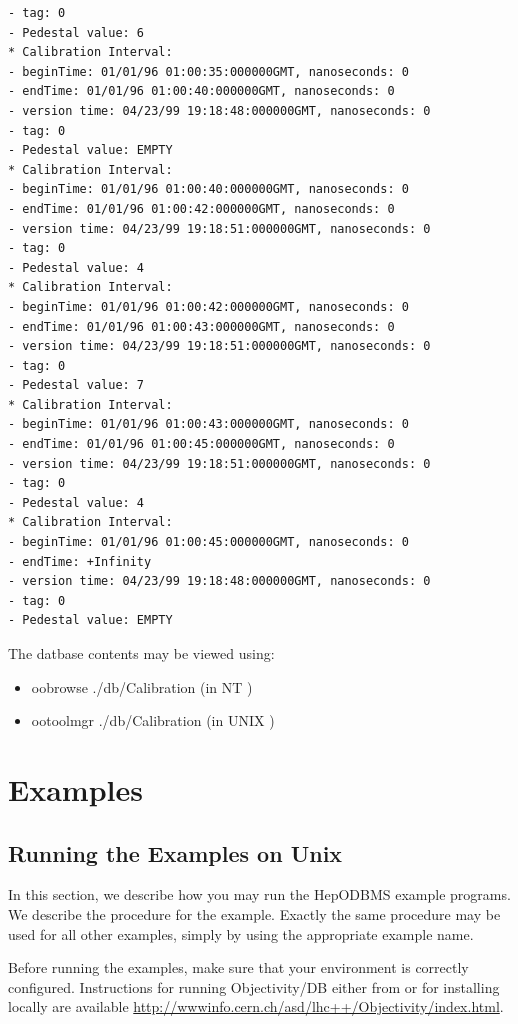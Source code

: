\begin{verbatim}
- tag: 0 
- Pedestal value: 6 
* Calibration Interval: 
- beginTime: 01/01/96 01:00:35:000000GMT, nanoseconds: 0 
- endTime: 01/01/96 01:00:40:000000GMT, nanoseconds: 0 
- version time: 04/23/99 19:18:48:000000GMT, nanoseconds: 0 
- tag: 0 
- Pedestal value: EMPTY 
* Calibration Interval: 
- beginTime: 01/01/96 01:00:40:000000GMT, nanoseconds: 0 
- endTime: 01/01/96 01:00:42:000000GMT, nanoseconds: 0 
- version time: 04/23/99 19:18:51:000000GMT, nanoseconds: 0 
- tag: 0 
- Pedestal value: 4 
* Calibration Interval: 
- beginTime: 01/01/96 01:00:42:000000GMT, nanoseconds: 0 
- endTime: 01/01/96 01:00:43:000000GMT, nanoseconds: 0 
- version time: 04/23/99 19:18:51:000000GMT, nanoseconds: 0 
- tag: 0 
- Pedestal value: 7 
* Calibration Interval: 
- beginTime: 01/01/96 01:00:43:000000GMT, nanoseconds: 0 
- endTime: 01/01/96 01:00:45:000000GMT, nanoseconds: 0 
- version time: 04/23/99 19:18:51:000000GMT, nanoseconds: 0 
- tag: 0 
- Pedestal value: 4 
* Calibration Interval: 
- beginTime: 01/01/96 01:00:45:000000GMT, nanoseconds: 0 
- endTime: +Infinity 
- version time: 04/23/99 19:18:48:000000GMT, nanoseconds: 0 
- tag: 0 
- Pedestal value: EMPTY 
\end{verbatim}

\par

The datbase contents may be viewed using:
\begin{itemize}

\item oobrowse ./db/Calibration (in NT ) 
\item ootoolmgr  ./db/Calibration  (in UNIX ) \end{itemize}
\chapter{Examples\label{H1Examples}}
\section{Running the Examples on Unix}

\par

In this section, we describe how you may run the HepODBMS example programs.
We describe the procedure for the  example. Exactly
the same procedure may be used for all other examples, simply by using the 
appropriate example name.

\par

Before running the examples, make sure that your environment is correctly configured.
Instructions for running Objectivity/DB either from  or for installing locally
are available \url{http://wwwinfo.cern.ch/asd/lhc++/Objectivity/index.html}.

